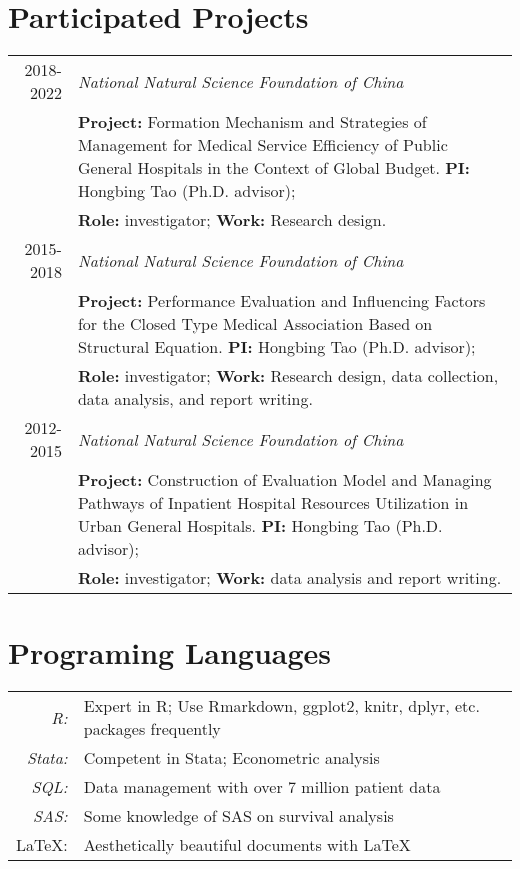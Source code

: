 \documentclass[a4paper,10pt]{article}
\begin{document}
\section{Participated Projects}
\begin{tabular}{r p{12cm}}
2018-2022 & \emph{National Natural Science Foundation of China } \\
		  &\textbf{Project:} Formation Mechanism and Strategies of Management for Medical Service Efficiency of Public General Hospitals in the Context of Global Budget.  \textbf{PI:} Hongbing Tao (Ph.D. advisor); \\
		  & \textbf{Role: }investigator; \textbf{Work:} Research design.\\[5pt]
2015-2018 & \emph{National Natural Science Foundation of China }  \\
		  & \textbf{Project:} Performance Evaluation and Influencing Factors for the Closed Type Medical Association Based on Structural Equation. \textbf{PI:} Hongbing Tao (Ph.D. advisor); \\
		  & \textbf{Role:} investigator; \textbf{Work:} Research design, data collection, data analysis, and report writing.\\[5pt]
2012-2015 & \emph{National Natural Science Foundation of China } \\
          & \textbf{Project:} Construction of Evaluation Model and Managing Pathways of Inpatient Hospital Resources Utilization in Urban General Hospitals. \textbf{PI:} Hongbing Tao (Ph.D. advisor); \\
          & \textbf{Role:} investigator; \textbf{Work:} data analysis and report writing.\\[5pt]
\end{tabular}

\section{Programing Languages}
\begin{tabular}{rl} 
	\textit{R:} & Expert in R; Use Rmarkdown, ggplot2, knitr, dplyr, etc. packages frequently\\
	\textit{Stata:} & Competent in Stata; Econometric analysis \\
	\textit{SQL:} & Data management with over 7 million patient data\\
	\textit{SAS:} & Some knowledge of SAS on survival analysis\\
	{\LaTeX}: & Aesthetically beautiful documents with \LaTeX
\end{tabular}
\end{document}
